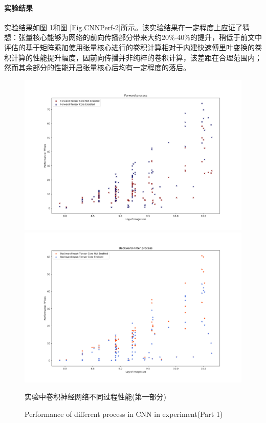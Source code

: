 \paragraph{实验结果}
\par 实验结果如图 \ref{Fig.CNNPerf-1}和图 \ref{Fig.CNNPerf-2}所示。该实验结果在一定程度上应证了猜想：张量核心能够为网络的前向传播部分带来大约20\%-40\%的提升，稍低于前文中评估的基于矩阵乘加使用张量核心进行的卷积计算相对于内建快速傅里叶变换的卷积计算的性能提升幅度，因前向传播并非纯粹的卷积计算，该差距在合理范围内；然而其余部分的性能开启张量核心后均有一定程度的落后。
\begin{figure}
	\centering
	\includegraphics[width=15cm]{figures/CNN-HALF-FWD.jpg}\\
	\includegraphics[width=15cm]{figures/CNN-HALF-BWD-FILTER.jpg}
	\renewcommand{\thefigure}{\arabic{section}-\arabic{figure} }
	\renewcommand{\figurename}{图}
	\caption{实验中卷积神经网络不同过程性能(第一部分)}
	\addtocounter{figure}{-1}
	\renewcommand{\thefigure}{\arabic{section}-\arabic{figure} }
	\renewcommand{\figurename}{Figure}
	\caption{Performance of different process in CNN in experiment(Part 1)}
	\label{Fig.CNNPerf-1}
\end{figure}
